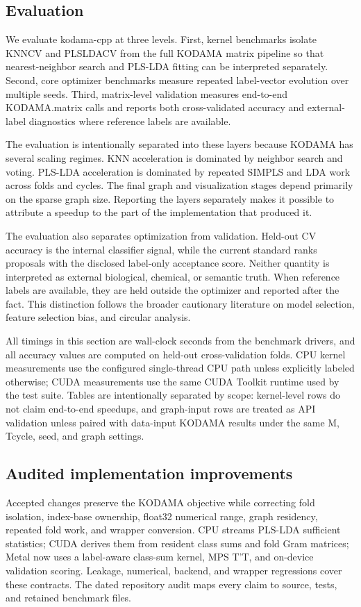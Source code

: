\documentclass[twoside,11pt]{article}
\begin{document}
\begin{small}
\section{Evaluation}
We evaluate kodama-cpp at three levels. First, kernel benchmarks isolate KNNCV and PLSLDACV from the full KODAMA matrix pipeline so that nearest-neighbor search and PLS-LDA fitting can be interpreted separately. Second, core optimizer benchmarks measure repeated label-vector evolution over multiple seeds. Third, matrix-level validation measures end-to-end KODAMA.matrix calls and reports both cross-validated accuracy and external-label diagnostics where reference labels are available.

The evaluation is intentionally separated into these layers because KODAMA has several scaling regimes. KNN acceleration is dominated by neighbor search and voting. PLS-LDA acceleration is dominated by repeated SIMPLS and LDA work across folds and cycles. The final graph and visualization stages depend primarily on the sparse graph size. Reporting the layers separately makes it possible to attribute a speedup to the part of the implementation that produced it.

The evaluation also separates optimization from validation. Held-out CV accuracy is the internal classifier signal, while the current standard ranks proposals with the disclosed label-only acceptance score. Neither quantity is interpreted as external biological, chemical, or semantic truth. When reference labels are available, they are held outside the optimizer and reported after the fact. This distinction follows the broader cautionary literature on model selection, feature selection bias, and circular analysis.

All timings in this section are wall-clock seconds from the benchmark drivers, and all accuracy values are computed on held-out cross-validation folds. CPU kernel measurements use the configured single-thread CPU path unless explicitly labeled otherwise; CUDA measurements use the same CUDA Toolkit runtime used by the test suite. Tables are intentionally separated by scope: kernel-level rows do not claim end-to-end speedups, and graph-input rows are treated as API validation unless paired with data-input KODAMA results under the same M, Tcycle, seed, and graph settings.

\subsection{Audited implementation improvements}
Accepted changes preserve the KODAMA objective while correcting fold isolation, index-base ownership, float32 numerical range, graph residency, repeated fold work, and wrapper conversion. CPU streams PLS-LDA sufficient statistics; CUDA derives them from resident class sums and fold Gram matrices; Metal now uses a label-aware class-sum kernel, MPS T'T, and on-device validation scoring. Leakage, numerical, backend, and wrapper regressions cover these contracts. The dated repository audit maps every claim to source, tests, and retained benchmark files.


\end{small}
\end{document}
